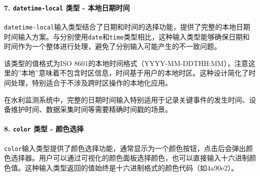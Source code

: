 \paragraph{\texorpdfstring{7. \texttt{datetime-local} 类型 - 本地日期时间}{7. datetime-local 类型 - 本地日期时间}}\label{datetime-local-ux7c7bux578b---ux672cux5730ux65e5ux671fux65f6ux95f4}

\texttt{datetime-local}输入类型结合了日期和时间的选择功能，提供了完整的本地日期时间输入方案。与分别使用\texttt{date}和\texttt{time}类型相比，这种输入类型能够确保日期和时间作为一个整体进行处理，避免了分别输入可能产生的不一致问题。

该类型的值格式为ISO 8601的本地时间格式（YYYY-MM-DDTHH:MM），注意这里的''本地''意味着不包含时区信息，时间基于用户的本地时区。这种设计简化了时间处理，特别适合于不涉及跨时区操作的本地化应用。

在水利监测系统中，完整的日期时间输入特别适用于记录关键事件的发生时间、设备维护时间、数据采集时间等需要精确时间戳的场景。

\begin{Shaded}
\begin{Highlighting}[]
\DataTypeTok{\textless{}}\OperatorTok{=}\DataTypeTok{\textgreater{}}\DataTypeTok{\textless{}/}\DataTypeTok{\textgreater{}}
\DataTypeTok{\textless{}}\OperatorTok{=}\OtherTok{ }
\OperatorTok{=}\OtherTok{ }
\OperatorTok{=}\OtherTok{ }
\OperatorTok{=}
\OperatorTok{=}
\OperatorTok{=}
\DataTypeTok{\textgreater{}}
\end{Highlighting}
\end{Shaded}

\paragraph{\texorpdfstring{8. \texttt{color} 类型 - 颜色选择}{8. color 类型 - 颜色选择}}\label{color-ux7c7bux578b---ux989cux8272ux9009ux62e9}

\texttt{color}输入类型提供了颜色选择功能，通常显示为一个颜色按钮，点击后会弹出颜色选择器。用户可以通过可视化的颜色面板选择颜色，也可以直接输入十六进制颜色值。这种输入类型返回的值始终是十六进制格式的颜色代码（如4a90e2）。

